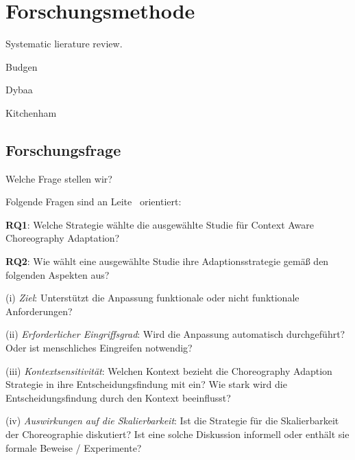 \documentclass[conference,compsoc]{IEEEtran}
\begin{document}




\section{Forschungsmethode}
Systematic lierature review.

Budgen\cite{budgen2006performing}

Dybaa\cite{dybaa2008empirical}

Kitchenham\cite{kitchenham2009systematic}
\subsection{Forschungsfrage}
Welche Frage stellen wir?

Folgende Fragen sind an Leite~\cite{leite2013systematic} orientiert:

\textbf{RQ1}: Welche Strategie wählte die ausgewählte Studie für Context Aware Choreography Adaptation? 

\textbf{RQ2}: Wie wählt eine ausgewählte Studie ihre Adaptionsstrategie gemäß den folgenden Aspekten aus?

(i) \textit{Ziel}: Unterstützt die Anpassung funktionale oder nicht funktionale Anforderungen?

(ii) \textit{Erforderlicher Eingriffsgrad}: Wird die Anpassung automatisch durchgeführt? Oder ist menschliches Eingreifen notwendig?

(iii) \textit{Kontextsensitivität}: Welchen Kontext bezieht die Choreography Adaption Strategie in ihre Entscheidungsfindung mit ein? Wie stark wird die Entscheidungsfindung durch den Kontext beeinflusst?

(iv) \textit{Auswirkungen auf die Skalierbarkeit}: Ist die Strategie für die Skalierbarkeit der Choreographie diskutiert? Ist eine solche Diskussion informell oder enthält sie formale Beweise / Experimente?
\end{document}
